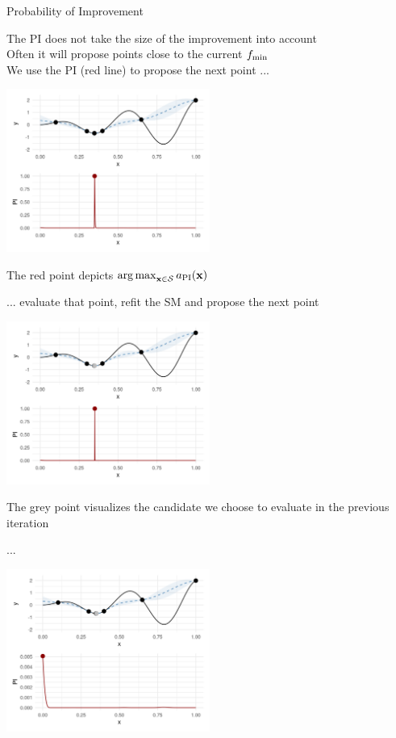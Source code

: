 \documentclass[11pt,compress,t,notes=noshow, xcolor=table]{beamer}
\begin{document}
\begin{vbframe}{Probability of Improvement}
\framebreak

The PI does not take the size of the improvement into account\\
\vspace{1em}
Often it will propose points close to the current $f_{\min}$\\
\vspace{1em}
We use the PI (red line) to propose the next point ...

\begin{center}
  \includegraphics[width = 0.5\textwidth]{figure_man/bayesian_loop_pi_1.png}
\end{center}

The red point depicts $\operatorname{arg\,max}_{\mathbf{x} \in \mathcal{S}} a_{\text{PI}}(\mathbf{x})$

\framebreak

... evaluate that point, refit the SM and propose the next point

\begin{center}
  \includegraphics[width = 0.5\textwidth]{figure_man/bayesian_loop_pi_2.png}
\end{center}

The grey point visualizes the candidate we choose to evaluate in the previous iteration

\framebreak

...

\begin{center}
  \includegraphics[width = 0.5\textwidth]{figure_man/bayesian_loop_pi_3.png}
\end{center}

\end{vbframe}
\end{document}
